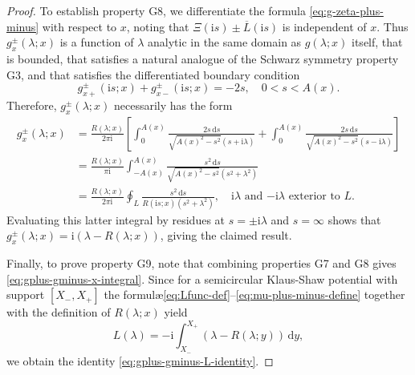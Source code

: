 \documentclass[12pt]{amsart}
\numberwithin{equation}{section}
\newcommand{\dd}{\mathrm{d}}
\newcommand{\ii}{\mathrm{i}}
\newcommand{\SP}{\lambda}
\newcommand{\tailint}{\Xi}
\begin{document}
\begin{proof}
To establish property G8, we differentiate the formula \eqref{eq:g-zeta-plus-minus} with respect to $x$, noting that $\tailint(\ii s)\pm \overline{L}(\ii s)$ is independent of $x$.  Thus $g^\pm_x(\SP;x)$ is a function of $\SP$ analytic in the same domain as $g(\SP;x)$ itself, that is bounded, that satisfies a natural analogue of the Schwarz symmetry property G3, and that satisfies the differentiated boundary condition
\begin{equation}
g_{x+}^\pm(\ii s;x)+g_{x-}^\pm(\ii s;x)=-2s,\quad 0<s<A(x).
\end{equation}
Therefore, $g_x^\pm(\SP;x)$ necessarily has the form
\begin{equation}
\begin{split}
g_x^\pm(\SP;x)&=\frac{R(\SP;x)}{2\pi \ii}\left[\int_0^{A(x)}\frac{2s\,\dd s}{\sqrt{A(x)^2-s^2}(s+\ii\SP)}
+\int_0^{A(x)}\frac{2s\,\dd s}{\sqrt{A(x)^2-s^2}(s-\ii\SP)}\right]\\
&=\frac{R(\SP;x)}{\pi \ii}\int_{-A(x)}^{A(x)}\frac{s^2\,\dd s}{\sqrt{A(x)^2-s^2}(s^2+\SP^2)}\\
&=\frac{R(\SP;x)}{2\pi \ii}\oint_L\frac{s^2\,\dd s}{R(\ii s;x)(s^2+\SP^2)},\quad\text{$\ii\SP$ and $-\ii\SP$ exterior to $L$.}
\end{split}
\end{equation}
Evaluating this latter integral by residues at $s=\pm \ii\SP$ and $s=\infty$ shows that $g_x^\pm(\SP;x)=\ii(\SP-R(\SP;x))$, giving the claimed result.

Finally, to prove property G9, note that combining properties G7 and G8 gives 
\eqref{eq:gplus-gminus-x-integral}.  
Since for a semicircular Klaus-Shaw potential with support $[X_-,X_+]$ the formul\ae \eqref{eq:Lfunc-def}--\eqref{eq:mu-plus-minus-define} together with the definition of $R(\SP;x)$ yield
\begin{equation}
L(\SP)=-\ii\int_{X_-}^{X_+}(\SP-R(\SP;y))\,\dd y,
\end{equation}
we obtain the identity \eqref{eq:gplus-gminus-L-identity}.
\end{proof}

\hprop*
\end{document}
